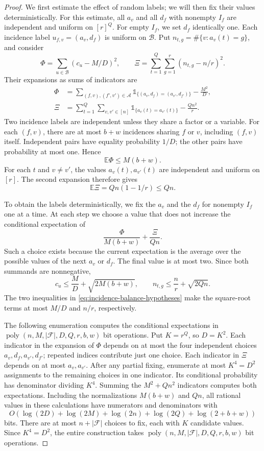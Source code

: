\documentclass[11pt,reqno]{amsart}
\numberwithin{equation}{section}
\theoremstyle{definition}\newtheorem{definition}[theorem]{Definition}
\theoremstyle{remark}\newtheorem{remark}[theorem]{Remark}
\newcommand{\poly}{\operatorname{poly}}
\renewcommand{\le}{\leqslant}
\begin{document}
\begin{proof}
We first estimate the effect of random labels; we will then fix
their values deterministically. For this estimate, all $a_v$ and
all $d_f$ with nonempty $I_f$ are independent and uniform on $[r]^Q$.
For empty $I_f$, we set $d_f$ identically one.
Each incidence label $u_{f,v}=(a_v,d_f)$ is uniform on $\mathcal B$.
Put $n_{t,g}=\#\{v:a_v(t)=g\}$, and consider
\[
 \Phi=\sum_{u\in\mathcal B}(c_u-M/D)^2,
 \qquad
 \Xi=\sum_{t=1}^Q\sum_{g=1}^r(n_{t,g}-n/r)^2.
\]
Their expansions as sums of indicators are
\[
 \begin{aligned}
 \Phi&=\sum_{(f,v),(f',v')\in\mathcal A}
       \mathds{1}_{\{(a_v,d_f)=(a_{v'},d_{f'})\}}-\frac{M^2}{D},\\
 \Xi&=\sum_{t=1}^Q\sum_{v,v'\in[n]}
       \mathds{1}_{\{a_v(t)=a_{v'}(t)\}}-\frac{Qn^2}{r}.
 \end{aligned}
\]
Two incidence labels are independent unless they share a factor or a
variable. For each $(f,v)$, there are at most $b+w$ incidences sharing
$f$ or $v$, including $(f,v)$ itself. Independent pairs have equality
probability $1/D$; the other pairs have probability at most one. Hence
\[
 \mathbb E\Phi\le M(b+w).
\]
For each $t$ and $v\ne v'$, the values $a_v(t),a_{v'}(t)$ are independent
and uniform on $[r]$. The second expansion therefore gives
\[
 \mathbb E\Xi=Qn(1-1/r)\le Qn.
\]

To obtain the labels deterministically, we fix the $a_v$ and the
$d_f$ for nonempty $I_f$ one at a time. At each step we choose a
value that does not increase the conditional expectation of
\[
 \frac{\Phi}{M(b+w)}+\frac{\Xi}{Qn}.
\]
Such a choice exists because the current expectation is the average
over the possible values of the next $a_v$ or $d_f$. The final value
is at most two. Since both summands are nonnegative,
\[
 c_u\le\frac MD+\sqrt{2M(b+w)},\qquad
 n_{t,g}\le\frac nr+\sqrt{2Qn}.
\]
The two inequalities in \eqref{eq:incidence-balance-hypotheses} make
the square-root terms at most $M/D$ and $n/r$, respectively.

The following enumeration computes the conditional expectations in
$\poly(n,M,|\mathcal F|,D,Q,r,b,w)$ bit operations.
Put $K=r^Q$, so $D=K^2$. Each indicator in the expansion of
$\Phi$ depends on at most the four independent choices
$a_v,d_f,a_{v'},d_{f'}$; repeated indices contribute just one choice.
Each indicator in $\Xi$ depends on at most $a_v,a_{v'}$. After any
partial fixing, enumerate at most $K^4=D^2$ assignments to the
remaining choices in one indicator. Its conditional probability has
denominator dividing $K^4$. Summing the $M^2+Qn^2$ indicators computes
both expectations. Including the normalizations $M(b+w)$ and $Qn$,
all rational values in these calculations have numerators and
denominators with
\[
 O\!\left(\log(2D)+\log(2M)+\log(2n)+\log(2Q)+\log(2+b+w)\right)
\]
bits. There are at most $n+|\mathcal F|$ choices to fix, each with
$K$ candidate values. Since $K^4=D^2$, the entire construction takes
$\poly(n,M,|\mathcal F|,D,Q,r,b,w)$ bit operations.
\end{proof}
\end{document}
